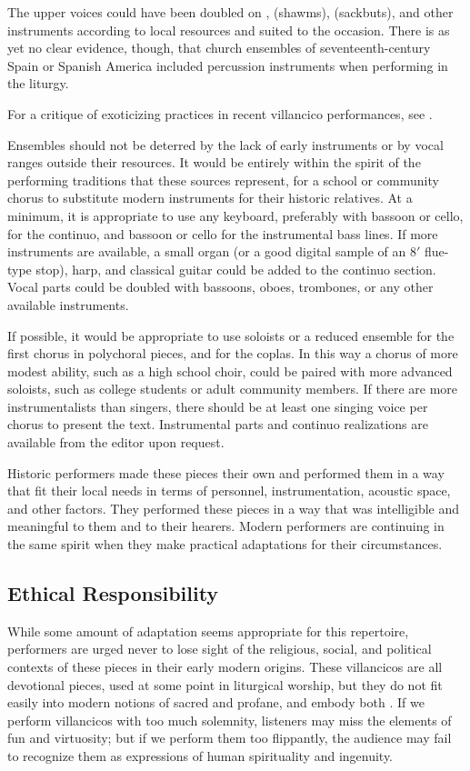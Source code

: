 The upper voices could have been doubled on ,
 (shawms),  (sackbuts), and other instruments
according to local resources and suited to the occasion.
There is as yet no clear evidence, though, that church ensembles of 
seventeenth-century Spain or Spanish America included percussion instruments
when performing in the liturgy.%
\begin{Footnote}
    For a critique of exoticizing practices in recent villancico performances,  
    see \autocites{Baker:PerformancePostColonial}{Davies:LocalContent}.
\end{Footnote}

Ensembles should not be deterred by the lack of early instruments or by vocal
ranges outside their resources.
It would be entirely within the spirit of the performing traditions that these
sources represent, for a school or community chorus to substitute modern
instruments for their historic relatives.
At a minimum, it is appropriate to use any keyboard, preferably with bassoon or
cello, for the continuo, and bassoon or cello for the instrumental bass lines.
If more instruments are available, a small organ (or a good digital sample of an 
8$'$ flue-type stop), harp, and classical guitar could be added to the continuo
section.  
Vocal parts could be doubled with bassoons, oboes, trombones, or any other
available instruments.

If possible, it would be appropriate to use soloists or a reduced ensemble for
the first chorus in polychoral pieces, and for the coplas.
In this way a chorus of more modest ability, such as a high school choir, could
be paired with more advanced soloists, such as college students or adult
community members.
If there are more instrumentalists than singers, there should be at least one
singing voice per chorus to present the text.
Instrumental parts and continuo realizations are available from the editor upon
request.

Historic performers made these pieces their own and performed them in a way
that fit their local needs in terms of personnel, instrumentation, acoustic
space, and other factors.
They performed these pieces in a way that was intelligible and meaningful to
them and to their hearers.
Modern performers are continuing in the same spirit when they make practical
adaptations for their circumstances.

\subsection{Ethical Responsibility}
While some amount of adaptation seems appropriate for this repertoire,
performers are urged never to lose sight of the religious, social, and political
contexts of these pieces in their early modern origins.
These villancicos are all devotional pieces, used at some point in liturgical
worship, but they do not fit easily into modern notions of sacred and profane,
and embody both .%
    \Autocite{Cashner:Cards}
If we perform villancicos with too much solemnity, listeners may miss the
elements of fun and virtuosity;
but if we perform them too flippantly, the audience may fail to recognize them
as expressions of human spirituality and ingenuity.

